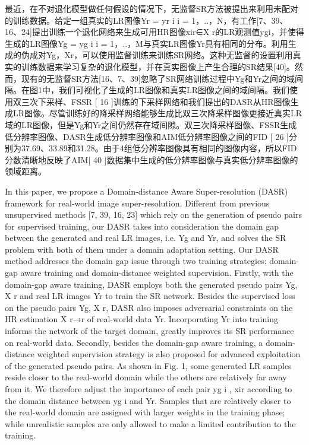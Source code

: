 最近，在不对退化模型做任何假设的情况下，无监督SR方法被提出来利用未配对的训练数据。给定一组真实的LR图像Yr = {yr i} i = 1，..，N，有工作[7、39、16、24]提出训练一个退化网络来生成可用HR图像xir∈X r的LR观测值ygi，并使得生成的LR图像Yg = { yg i } i = 1，..，M与真实LR图像Yr具有相同的分布。利用生成的伪成对{Yg，Xr}，可以使用监督训练来训练SR网络。这种无监督的设置利用真实的训练数据来学习复杂的退化模型，并在真实图像上产生合理的SR结果[40]。然而，现有的无监督SR方法[16、7、39]忽略了SR网络训练过程中Yg和Yr之间的域间隔。在图1中，我们可视化了生成的LR图像和真实LR图像之间的域间隔。我们使用双三次下采样、FSSR [ 16 ]训练的下采样网络和我们提出的DASR从HR图像生成LR图像。尽管训练好的降采样网络能够生成比双三次降采样图像更接近真实LR域的LR图像，但是Yg和Yr之间仍然存在域间隙。双三次降采样图像、FSSR生成低分辨率图像、DASR生成低分辨率图像和AIM低分辨率图像之间的FID [ 26 ]分别为37.69、33.89和31.28。由于4组低分辨率图像具有相同的图像内容，所以FID分数清晰地反映了AIM[ 40 ]数据集中生成的低分辨率图像与真实低分辨率图像的领域距离。

In this paper, we propose a Domain-distance Aware Super-resolution (DASR) framework for real-world image super-resolution. Different from previous unsupervised methods [7, 39, 16, 23] which rely on the generation of pseudo pairs for supervised training, our DASR takes into consideration the domain gap between the generated and real LR images, i.e. Yg and Yr, and solves the SR problem with both of them under a domain adaptation setting. Our DASR method addresses the domain gap issue through two training strategies: domain-gap aware training and domain-distance weighted supervision. Firstly, with the domain-gap aware training, DASR employs both the generated pseudo pairs {Yg, X r} and real LR images Yr to train the SR network. Besides the supervised loss on the pseudo pairs {Yg, X r}, DASR also imposes adversarial constraints on the HR estimation X r→r of real-world data Yr. Incorporating Yr into training informs the network of the target domain, greatly improves its SR performance on real-world data. Secondly, besides the domain-gap aware training, a domain-distance weighted supervision strategy is also proposed for advanced exploitation of the generated pseudo pairs. As shown in Fig. 1, some generated LR samples reside closer to the real-world domain while the others are relatively far away from it. We therefore adjust the importance of each pair {yg i , xir} according to the domain distance between yg i and Yr. Samples that are relatively closer to the real-world domain are assigned with larger weights in the training phase; while unrealistic samples are only allowed to make a limited contribution to the training.


